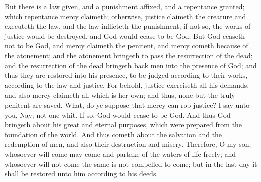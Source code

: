 But there is a law given, and a punishment affixed, and a repentance granted; which repentance mercy claimeth; otherwise, justice claimeth the creature and executeth the law, and the law inflicteth the punishment; if not so, the works of justice would be destroyed, and God would cease to be God.
\bverse \iffalse But God ceaseth not to be God, and mercy claimeth the penitent, and mercy cometh because of the atonement; and the atonement bringeth to pass the resurrection of the dead; and the resurrection of the dead bringeth back men into the presence of God; and thus they are restored into his presence, to be judged according to their works, according to the law and justice. \fi
But God ceaseth not to be God, and mercy claimeth the penitent, and mercy cometh because of the atonement; and the atonement bringeth to pass the resurrection of the dead; and the resurrection of the dead bringeth back men into the presence of God; and thus they are restored into his presence, to be judged according to their works, according to the law and justice.
\bverse \iffalse For behold, justice exerciseth all his demands, and also mercy claimeth all which is her own; and thus, none but the truly penitent are saved. \fi
For behold, justice exerciseth all his demands, and also mercy claimeth all which is her own; and thus, none but the truly penitent are saved.
\bverse \iffalse What, do ye suppose that mercy can rob justice? I say unto you, Nay; not one whit. If so, God would cease to be God. \fi
What, do ye suppose that mercy can rob justice? I say unto you, Nay; not one whit. If so, God would cease to be God.
\bverse \iffalse And thus God bringeth about his great and eternal purposes, which were prepared from the foundation of the world. And thus cometh about the salvation and the redemption of men, and also their destruction and misery. \fi
And thus God bringeth about his great and eternal purposes, which were prepared from the foundation of the world. And thus cometh about the salvation and the redemption of men, and also their destruction and misery.
\bverse \iffalse Therefore, O my son, whosoever will come may come and partake of the waters of life freely; and whosoever will not come the same is not compelled to come; but in the last day it shall be restored unto him according to his deeds. \fi
Therefore, O my son, whosoever will come may come and partake of the waters of life freely; and whosoever will not come the same is not compelled to come; but in the last day it shall be restored unto him according to his deeds.
